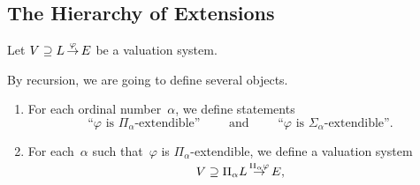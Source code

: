 \documentclass[main.tex]{subfiles}
\begin{document}
\subsection{The Hierarchy of Extensions}
Let $V \supseteq L\,\smash{\stackrel{\varphi}{\rightarrow}}\,E$ be a valuation system.
\begin{dfn}
By recursion,
we are going to define 
several objects.
\begin{enumerate}
\item For each ordinal number~$\alpha$,
we define statements
\begin{equation*}
\text{``$\varphi$ is $\Pi_\alpha$-extendible''}
\qquad\text{ and }\qquad
\text{``$\varphi$ is $\Sigma_\alpha$-extendible''.}
\end{equation*}
\item
For each~$\alpha$ such that~$\varphi$ 
is $\Pi_\alpha$-extendible,
we define a valuation system 
\begin{equation*}
V \supseteq \Pi_\alpha L\,\smash{\stackrel{\Pi_\alpha \varphi}{\rightarrow}}\,E,
\end{equation*}


\end{enumerate}
\end{dfn}
\end{document}
